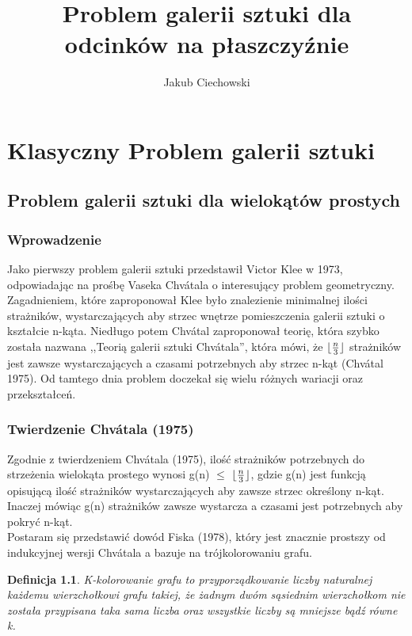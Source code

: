 \documentclass[brudnopis]{xmgr}
\author   {Jakub Ciechowski}
\title    {Problem galerii sztuki dla odcinków na płaszczyźnie}
\date     {\ymdtoday}
\DeclarePairedDelimiter\floor{\lfloor}{\rfloor}
\newtheorem{Definicja}{Definicja}
\begin{document}
%

%

\chapter{Klasyczny Problem galerii sztuki}

\section{Problem galerii sztuki dla wielokątów prostych}

\subsection{Wprowadzenie}
Jako pierwszy problem galerii sztuki przedstawił Victor Klee w 1973, odpowiadając na prośbę Vaseka Chv\'atala o interesujący problem geometryczny. Zagadnieniem, które zaproponował Klee było znalezienie minimalnej ilości strażników, wystarczających aby strzec wnętrze pomieszczenia galerii sztuki o kształcie n-kąta. Niedługo potem Chv\'atal zaproponował teorię, która szybko została nazwana ,,Teorią galerii sztuki Chv\'atala'', która mówi, że $\floor{\frac{n}{3}}$ strażników jest zawsze wystarczających a czasami potrzebnych aby strzec n-kąt (Chv\'atal 1975). Od tamtego dnia problem doczekał się wielu różnych wariacji oraz przekształceń.
\subsection{Twierdzenie Chv\'atala (1975)}
Zgodnie z twierdzeniem Chv\'atala (1975)\label{tw chvatala}, ilość strażników potrzebnych do strzeżenia wielokąta prostego wynosi g(n) $\le$ $\floor{\frac{n}{3}}$, gdzie g(n) jest funkcją opisującą ilość strażników wystarczających aby zawsze strzec określony n-kąt. Inaczej mówiąc g(n) strażników zawsze wystarcza a czasami jest potrzebnych aby pokryć n-kąt.
\\Postaram się przedstawić dowód Fiska (1978), który jest znacznie prostszy od indukcyjnej wersji Chv\'atala a bazuje na trójkolorowaniu grafu. 

\begin{Definicja}
K-kolorowanie grafu to przyporządkowanie liczby naturalnej każdemu wierzchołkowi grafu takiej, że żadnym dwóm sąsiednim wierzchołkom nie została przypisana taka sama liczba oraz wszystkie liczby są mniejsze bądź równe k.
\end{Definicja}
\end{document}
